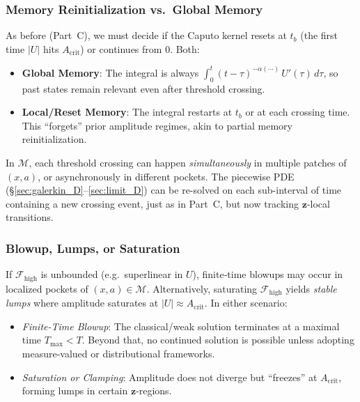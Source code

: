 \documentclass[12pt]{article}
\begin{document}
\subsubsection{Memory Reinitialization vs.\ Global Memory}
\label{subsubsec:memory_extended}

As before (Part~C), we must decide if the Caputo kernel resets at $t_b$ (the first time 
$\lvert U\rvert$ hits $A_{\mathrm{crit}}$) or continues from $0$. Both:

\begin{itemize}
\item \textbf{Global Memory}:
  The integral is always $\int_0^t \!\!(t-\tau)^{-\alpha(\cdots)}\,U'(\tau)\,d\tau$, 
  so past states remain relevant even after threshold crossing.
\item \textbf{Local/Reset Memory}:
  The integral restarts at $t_b$ or at each crossing time. This “forgets” prior amplitude 
  regimes, akin to partial memory reinitialization.
\end{itemize}

In $\mathcal{M}$, each threshold crossing can happen \emph{simultaneously} in multiple 
patches of $(x,a)$, or asynchronously in different pockets. The piecewise PDE 
(\S\ref{sec:galerkin_D}--\ref{sec:limit_D}) can be re-solved on each sub-interval of time 
containing a new crossing event, just as in Part~C, but now tracking $\mathbf{z}$‐local 
transitions.

\subsubsection{Blowup, Lumps, or Saturation}
\label{subsubsec:blowup_extended}

If $\mathcal{F}_{\mathrm{high}}$ is unbounded (e.g.\ superlinear in $U$), 
finite‐time blowups may occur in localized pockets of $(x,a)\in\mathcal{M}$. 
Alternatively, saturating $\mathcal{F}_{\mathrm{high}}$ yields \emph{stable lumps} 
where amplitude saturates at $|U|\approx A_{\mathrm{crit}}$.  
In either scenario:
\begin{itemize}
  \item \emph{Finite-Time Blowup}:
    The classical/weak solution terminates at a maximal time $T_{\mathrm{max}}<T$. 
    Beyond that, no continued solution is possible unless adopting measure-valued or 
    distributional frameworks.
  \item \emph{Saturation or Clamping}:
    Amplitude does not diverge but “freezes” at $A_{\mathrm{crit}}$, forming lumps in 
    certain $\mathbf{z}$‐regions. 
\end{itemize}
\end{document}
